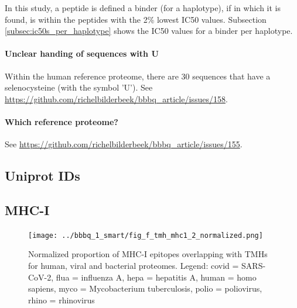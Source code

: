 In this study, a peptide is defined a binder (for a haplotype), 
if  in which it is found, 
is within the peptides with the 2\% lowest IC50 values.
Subsection \ref{subsec:ic50s_per_haplotype} shows the IC50 values
for a binder per haplotype.

\paragraph{Unclear handing of sequences with U}

Within the human reference proteome, there are 30 sequences that have a
selenocysteine (with the symbol 'U').
See \url{https://github.com/richelbilderbeek/bbbq_article/issues/158}.

\paragraph{Which reference proteome?}

See \url{https://github.com/richelbilderbeek/bbbq_article/issues/155}.


\subsection{Uniprot IDs}



\subsection{MHC-I}

\begin{figure}[!htbp]
  \texttt{[image: ../bbbq\_1\_smart/fig\_f\_tmh\_mhc1\_2\_normalized.png]}
  \caption{
    Normalized proportion of MHC-I epitopes overlapping with TMHs
    for human, viral and bacterial proteomes.
    Legend: covid = SARS-CoV-2, flua = influenza A, hepa = hepatitis A,
    human = homo sapiens, myco = Mycobacterium tuberculosis, 
    polio = poliovirus, rhino = rhinovirus
  }
  \label{fig:f_tmh_mhc1_normalized}
\end{figure}



